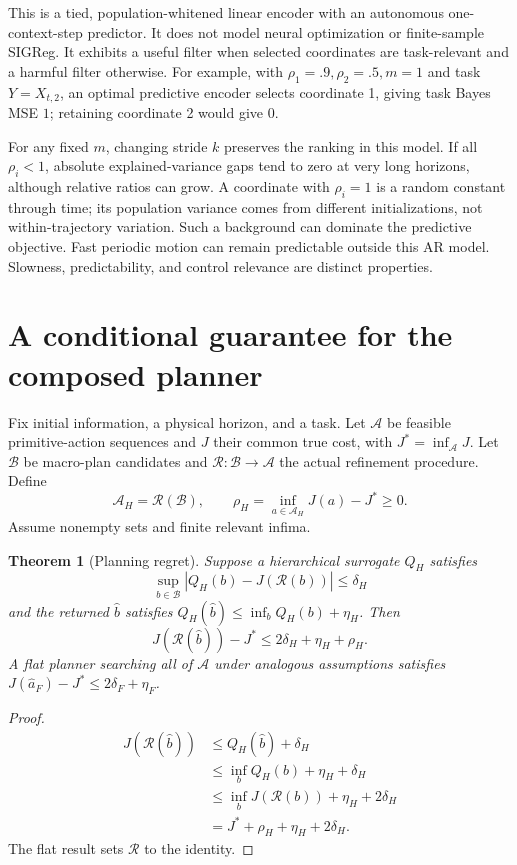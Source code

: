 \documentclass[11pt]{article}
\newtheorem{theorem}{Theorem}
\begin{document}
This is a tied, population-whitened linear encoder with an autonomous one-context-step predictor. It does not model neural optimization or finite-sample SIGReg. It exhibits a useful filter when selected coordinates are task-relevant and a harmful filter otherwise. For example, with $\rho_1=.9,\rho_2=.5,m=1$ and task $Y=X_{t,2}$, an optimal predictive encoder selects coordinate 1, giving task Bayes MSE $1$; retaining coordinate 2 would give $0$.

For any fixed $m$, changing stride $k$ preserves the ranking in this model. If all $\rho_i<1$, absolute explained-variance gaps tend to zero at very long horizons, although relative ratios can grow. A coordinate with $\rho_i=1$ is a random constant through time; its population variance comes from different initializations, not within-trajectory variation. Such a background can dominate the predictive objective. Fast periodic motion can remain predictable outside this AR model. Slowness, predictability, and control relevance are distinct properties.

\section{A conditional guarantee for the composed planner}
Fix initial information, a physical horizon, and a task. Let $\mathcal A$ be feasible primitive-action sequences and $J$ their common true cost, with $J^*=\inf_{\mathcal A}J$. Let $\mathcal B$ be macro-plan candidates and $\mathcal R:\mathcal B\to\mathcal A$ the actual refinement procedure. Define
\[
 \mathcal A_H=\mathcal R(\mathcal B),\qquad
 \rho_H=\inf_{a\in\mathcal A_H}J(a)-J^*\geq0.
\]
Assume nonempty sets and finite relevant infima.

\begin{theorem}[Planning regret]
\label{thm:planning}
Suppose a hierarchical surrogate $Q_H$ satisfies
\[
 \sup_{b\in\mathcal B}|Q_H(b)-J(\mathcal R(b))|\leq\delta_H
\]
and the returned $\widehat b$ satisfies
$Q_H(\widehat b)\leq\inf_bQ_H(b)+\eta_H$. Then
\begin{equation}
 \boxed{J(\mathcal R(\widehat b))-J^*\leq
 2\delta_H+\eta_H+\rho_H.}
 \label{eq:regret}
\end{equation}
A flat planner searching all of $\mathcal A$ under analogous assumptions satisfies
$J(\widehat a_F)-J^*\leq2\delta_F+\eta_F$.
\end{theorem}
\begin{proof}
\begin{align*}
 J(\mathcal R(\widehat b))
 &\leq Q_H(\widehat b)+\delta_H\\
 &\leq\inf_bQ_H(b)+\eta_H+\delta_H\\
 &\leq\inf_bJ(\mathcal R(b))+\eta_H+2\delta_H\\
 &=J^*+\rho_H+\eta_H+2\delta_H.
\end{align*}
The flat result sets $\mathcal R$ to the identity.
\end{proof}
\end{document}
